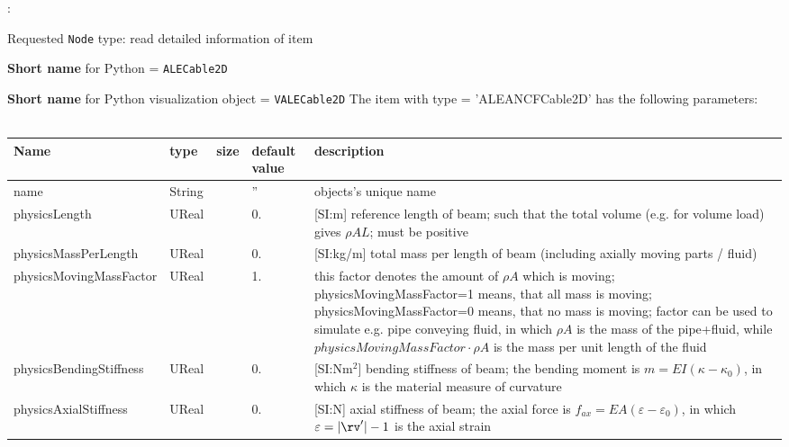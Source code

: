 \noindent {}:
\bi
  \item Requested \texttt{Node} type: read detailed information of item
  \item {\bf Short name} for Python = \texttt{ALECable2D}
  \item {\bf Short name} for Python visualization object = \texttt{VALECable2D}
\ei\vspace{12pt} \noindent 
The item  with type = 'ALEANCFCable2D' has the following parameters:
\vspace{-0.5cm}\\
\vspace{-0.5cm}\\
\begin{center}
  \footnotesize
  \begin{longtable}{| p{4.5cm} | p{2.5cm} | p{0.5cm} | p{2.5cm} | p{6cm} |}
    \hline
    \bf Name & \bf type & \bf size & \bf default value & \bf description \\ \hline
    name &     String &      &     '' &     objects's unique name\\ \hline
    physicsLength &     UReal &      &     0. &      [SI:m] reference length of beam; such that the total volume (e.g. for volume load) gives $\rho A L$; must be positive\\ \hline
    physicsMassPerLength &     UReal &      &     0. &      [SI:kg/m] total mass per length of beam (including axially moving parts / fluid)\\ \hline
    physicsMovingMassFactor &     UReal &      &     1. &     this factor denotes the amount of $\rho A$ which is moving; physicsMovingMassFactor=1 means, that all mass is moving; physicsMovingMassFactor=0 means, that no mass is moving; factor can be used to simulate e.g. pipe conveying fluid, in which $\rho A$ is the mass of the pipe+fluid, while $physicsMovingMassFactor \cdot \rho A$ is the mass per unit length of the fluid\\ \hline
    physicsBendingStiffness &     UReal &      &     0. &      [SI:Nm$^2$] bending stiffness of beam; the bending moment is $m = EI (\kappa - \kappa_0)$, in which $\kappa$ is the material measure of curvature\\ \hline
    physicsAxialStiffness &     UReal &      &     0. &      [SI:N] axial stiffness of beam; the axial force is $f_{ax} = EA (\varepsilon -\varepsilon_0)$, in which $\varepsilon = |\rv^\prime|-1$ is the axial strain\\ \hline

\end{longtable}
\end{center}
